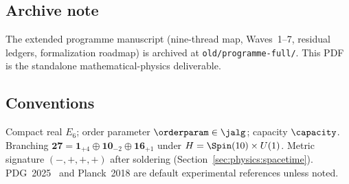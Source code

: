 \subsection{Archive note}

The extended programme manuscript (nine-thread map, Waves~1--7, residual
ledgers, formalization roadmap) is archived at
\texttt{old/programme-full/}. This PDF is the standalone mathematical-physics
deliverable.

\subsection{Conventions}

Compact real $E_6$; order parameter $\orderparam\in\jalg$; capacity
$\capacity$. Branching
$\mathbf{27}=\mathbf{1}_{+4}\oplus\mathbf{10}_{-2}\oplus\mathbf{16}_{+1}$
under $H=\Spin(10)\times U(1)$. Metric signature $(-,+,+,+)$ after soldering
(Section~\ref{sec:physics:spacetime}). PDG~2025~\cite{PDG2025} and Planck~2018
are default experimental references unless noted.